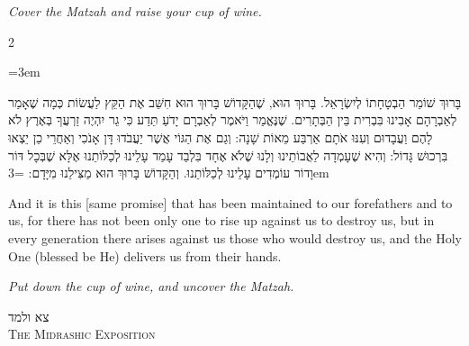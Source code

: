 \documentclass[11pt, openany]{book}
\newcommand{\instruction}[1]{%
  \par\vspace{3pt}
  \begin{tcolorbox}[
    enhanced,
    breakable,
    colback=sederlight,
    colframe=sederlight,
    boxrule=0pt,
    left=10pt,
    right=6pt,
    top=4pt,
    bottom=4pt,
    borderline west={2pt}{0pt}{sederwine!60},
    arc=0pt,
    outer arc=0pt,
  ]
    {\small\itshape\textcolor{sederwine}{#1}}
  \end{tcolorbox}
  \par\vspace{2pt}
}
\newenvironment{bilingual}{%
  \par\vspace{4pt}%
  \begin{paracol}{2}%
}{%
  \end{paracol}%
  \par\vspace{2pt}%
}
\newenvironment{hebrewcol}{%
  \switchcolumn[1]%
  \begingroup
  \RTL
  \hebrewfont\large
  \setstretch{1.4}%
  \emergencystretch=3em
  \tolerance=9999
  \parindent=0pt\relax
}{%
  \endRTL
  \endgroup
}
\newenvironment{englishcol}{%
  \switchcolumn[0]%
  \begingroup
  \setstretch{1.4}%
  \emergencystretch=3em
  \tolerance=9999
  \normalsize
  \rightskip=0.12in\relax
}{%
  \endgroup
}
\newcommand{\subsedertitle}[2]{%
  \par\vspace{8pt}
  \begin{center}
    {\hebrewfontlarge\textcolor{sederblue}{\beginR #1\endR}}\\[3pt]
    {\normalsize\scshape\textcolor{sederblue}{#2}}
  \end{center}
  \par\vspace{3pt}
}
\begin{document}
\instruction{Cover the Matzah and raise your cup of wine.}

\begin{bilingual}
\begin{hebrewcol}
בָּרוּךְ שׁוֹמֵר הַבְטָחָתוֹ לְיִשְׂרָאֵל. בָּרוּךְ הוּא, שֶׁהַקָּדוֹשׁ בָּרוּךְ הוּא חִשֵּׁב אֶת הַקֵּץ לַעֲשׂוֹת כְּמָה שֶׁאָמַר לְאַבְרָהָם אָבִינוּ בִּבְרִית בֵּין הַבְּתָרִים. שֶׁנֶּאֱמַר וַיֹּאמֶר לְאַבְרָם יָדֹעַ תֵּדַע כִּי גֵר יִהְיֶה זַרְעֲךָ בְּאֶרֶץ לֹא לָהֶם וַעֲבָדוּם וְעִנּוּ אֹתָם אַרְבַּע מֵאוֹת שָׁנָה: וְגַם אֶת הַגּוֹי אֲשֶׁר יַעֲבֹדוּ דָּן אָנֹכִי וְאַחֲרֵי כֵן יֵצְאוּ בִּרְכוּשׁ גָּדוֹל:
וְהִיא שֶׁעָמְדָה לַאֲבוֹתֵינוּ וְלָנוּ שֶׁלֹא אֶחָד בִּלְבַד עָמַד עָלֵינוּ לְכַלּוֹתֵנוּ אֶלָּא שֶׁבְּכָל דּוֹר וָדוֹר עוֹמְדִים עָלֵינוּ לְכַלּוֹתֵנוּ. וְהַקָּדוֹשׁ בָּרוּךְ הוּא מַצִּילֵנוּ מִיָּדָם:
\end{hebrewcol}
\begin{englishcol}
And it is this [same promise] that has been maintained to our forefathers and to us, for there has not been only one to rise up against us to destroy us, but in every generation there arises against us those who would destroy us, and the Holy One (blessed be He) delivers us from their hands.
\end{englishcol}
\end{bilingual}
\instruction{Put down the cup of wine, and uncover the Matzah.}

\subsedertitle{צא ולמד}{The Midrashic Exposition}
\end{document}
